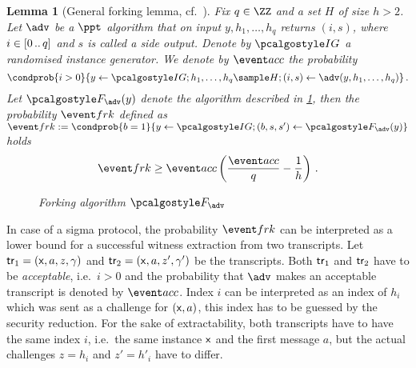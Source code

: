 \let\accentvec\vec \documentclass[runningheads,10pt]{llncs}
\newtheorem{lemma}[theorem]{Lemma}
\begin{document}
\begin{lemma}[General forking lemma, cf.~\cite{INDOCRYPT:FKMV12,CCS:BelNev06}]
	\label{lem:forking_lemma}
	Fix $q \in \ZZ$ and a set $H$ of size $h > 2$. Let $\adv$ be a $\ppt$ algorithm that on input $y, h_1, \ldots, h_q$ returns $(i, s)$, where $i \in[0 \, .. \, q]$ and $s$ is called a \emph{side output}.
	Denote by $\ig$ a randomised instance generator.
	We denote by $\accProb$ the probability
	\[
		\condprob{i > 0}{y \gets \ig; h_1, \ldots, h_q \sample H; (i, s) \gets \adv(y, h_1, \ldots, h_q)}\,.
	\]
	Let $\forking_\adv(y)$ denote the algorithm described in \cref{fig:forking_lemma}, then the probability $\frkProb$ defined as
	$
		\frkProb := \condprob{b = 1}{y \gets \ig; (b, s, s') \gets \forking_{\adv}(y)}
	$
	holds
	\[
		\frkProb \geq \accProb \brak{\frac{\accProb}{q} - \frac{1}{h}}\,.
	\]
	\begin{figure}
		\centering
		\caption{Forking algorithm $\forking_\adv$}
		\label{fig:forking_lemma}
\end{figure}
\end{lemma}
%
In case of a sigma protocol, the probability $\frkProb$ can be interpreted as a lower bound for a successful witness extraction from two transcripts.
Let $\mathsf{tr}_1 = (\mathsf{x}, a, z, \gamma)$ and $\mathsf{tr}_2 = (\mathsf{x}, a, z', \gamma')$ be the transcripts.
Both $\mathsf{tr}_1$ and $\mathsf{tr}_2$ have to be \emph{acceptable}, i.e.~$i > 0$ and the probability that $\adv$ makes an acceptable transcript is denoted by $\accProb$. 
Index $i$ can be interpreted as an index of $h_i$ which was sent as a challenge for $(\mathsf{x}, a)$, this index has to be guessed by the security reduction. 
For the sake of extractability, both transcripts have to have the same index $i$, i.e.~the same instance $\mathsf{x}$ and the first message $a$, but the actual challenges $z = h_i$ and $z' = h'_{i}$ have to differ.
\end{document}
